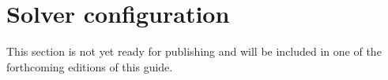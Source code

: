 
\section{Solver configuration}
\label{sec:configuration}

This section is not yet ready for publishing
and will be included in one of the forthcoming editions of this guide.

